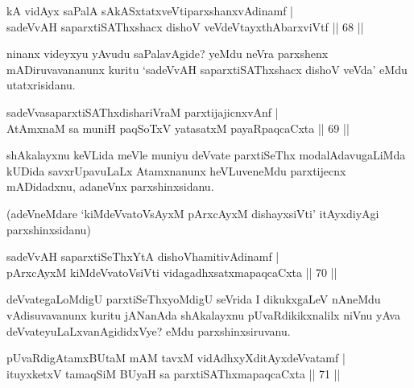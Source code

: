 \begin{shl}
kA vidAyx saPalA sAkASxtatxveVtiparxshanxvAdinamf |\\
sadeVvAH saparxtiSAThxshacx dishoV veVdeVtayxthAbarxviVtf \hfill || 68 ||
\end{shl}

\begin{artha}
ninanx videyxyu yAvudu saPalavAgide? yeMdu neVra parxshenx mADiruvavananunx kuritu `sadeVvAH saparxtiSAThxshacx dishoV veVda' eMdu utatxrisidanu.
\end{artha}


\begin{shl}
sadeVvasaparxtiSAThxdishariVraM parxtijajicnxvAnf |\\
AtAmxnaM sa muniH paqSoTxV yatasatxM payaRpaqcaCxta \hfill || 69 ||
\end{shl}

\begin{artha}
shAkalayxnu keVLida meVle muniyu deVvate parxtiSeThx modalAdavugaLiMda kUDida savxrUpavuLaLx Atamxnanunx heVLuveneMdu parxtijecnx mADidadxnu, adaneVnx parxshinxsidanu.

(adeVneMdare `kiMdeVvatoV\s sAyxM pArxcAyxM dishayxsiVti' itAyxdiyAgi parxshinxsidanu)
\end{artha}


\begin{shl}
sadeVvAH saparxtiSeThxYtA dishoV\s hamitivAdinamf |\\
pArxcAyxM kiMdeVvatoV\s siVti vidagadhxsatxmapaqcaCxta \hfill || 70 ||
\end{shl}

\begin{artha}
deVvategaLoMdigU parxtiSeThxyoMdigU seVrida I dikukxgaLeV nAneMdu vAdisuvavanunx kuritu jANanAda shAkalayxnu pUvaRdikikxnalilx niVnu yAva deVvateyuLaLxvanAgididxVye? eMdu parxshinxsiruvanu.
\end{artha}


\begin{shl}
pUvaRdigAtamxBUtaM mAM tavxM vidAdhxyXditAyxdeVvatamf |\\
ituyxketxV tamaqSiM BUyaH sa parxtiSAThxmapaqcaCxta \hfill || 71 ||
\end{shl}

